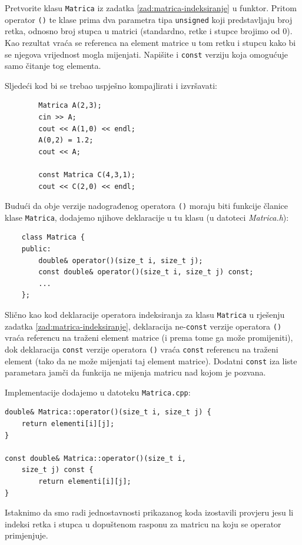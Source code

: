 \begin{zadatak}\label{zad:matrice-funktor}
    Pretvorite klasu \texttt{Matrica} iz zadatka \ref{zad:matrica-indeksiranje} u funktor.
    Pritom operator \texttt{()} te klase
    prima dva parametra tipa \texttt{unsigned}
    koji predstavljaju broj retka, odnosno broj stupca u matrici (standardno,
    retke i stupce brojimo od $0$).
    Kao rezultat vraća se referenca na element matrice u tom retku i stupcu kako bi se njegova vrijednost mogla mijenjati. 
    Napišite i \texttt{const} verziju koja omogućuje samo čitanje tog elementa.
    \medskip

    Sljedeći kod bi se trebao uspješno kompajlirati i izvršavati:
    \begin{verbatim}
        Matrica A(2,3);
        cin >> A;
        cout << A(1,0) << endl;
        A(0,2) = 1.2;
        cout << A;
        
        const Matrica C(4,3,1);
        cout << C(2,0) << endl;
    \end{verbatim}
\end{zadatak}


\begin{rjesenje}
    Budući da obje verzije nadograđenog operatora
    \texttt{()} moraju biti funkcije članice klase \texttt{Matrica}, dodajemo
    njihove deklaracije u tu klasu (u datoteci \textit{Matrica.h}):

    \begin{verbatim}    
    class Matrica {
    public:
        double& operator()(size_t i, size_t j);
        const double& operator()(size_t i, size_t j) const;
        ...
    };
    \end{verbatim}

    Slično kao kod deklaracije operatora indeksiranja 
    za klasu \texttt{Matrica} 
    u rješenju zadatka \ref{zad:matrica-indeksiranje},
    deklaracija ne-\texttt{const} verzije
    operatora \texttt{()} vraća referencu na traženi element matrice
    (i prema tome ga može promijeniti),
    dok deklaracija \texttt{const} verzije operatora \texttt{()}
    vraća \texttt{const} referencu na traženi element
    (tako da ne može mijenjati taj element matrice).
    Dodatni \texttt{const} iza liste parametara 
    jamči da funkcija ne mijenja matricu nad kojom je pozvana.
    \medskip
    
    Implementacije dodajemo u datoteku \texttt{Matrica.cpp}:
    \begin{verbatim}    
double& Matrica::operator()(size_t i, size_t j) {
    return elementi[i][j];
}
    
const double& Matrica::operator()(size_t i, 
    size_t j) const {
        return elementi[i][j];
}
    \end{verbatim}
    Istaknimo da smo radi jednostavnosti prikazanog koda izostavili
    provjeru jesu li indeksi retka i stupca u dopuštenom rasponu za matricu na koju se operator primjenjuje.
\end{rjesenje}


